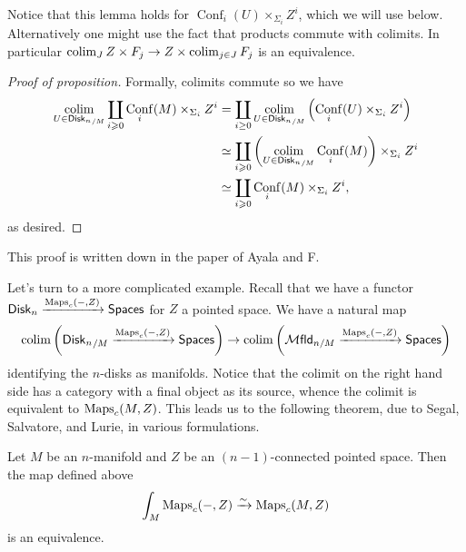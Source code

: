 \documentclass{amsart}
\DeclareMathOperator{\Conf}{Conf}
\newcommand{\disk}{\mathsf{Disk}_n}
\begin{document}
Notice that this lemma holds for $\Conf_i(U)\times_{\Sigma_i}Z^i$, which we will use
below. Alternatively one might use the fact that products commute with colimits.
In particular $\operatorname*{colim}_J Z\times F_j\to Z\times \operatorname*{colim}_{j\in J} F_j$ is an equivalence.

\begin{proof}[Proof of proposition]
    Formally, colimits commute so we have
    \begin{align*}
        \colim_{U\in{\disk}_{/M}} \coprod_{i\geqslant 0} \Conf_i(M)\times_{\Sigma_i}Z^i &= \coprod_{i\geq 0}\colim_{U\in{\disk}_{/M}}\left(\Conf_i(U)\times_{\Sigma_i}Z^i\right) \\
        &\simeq \coprod_{i\geqslant 0} \left(\colim_{U\in{\disk}_{/M}}\Conf_i(M)\right) \times_{\Sigma_i} Z^i \\
        &\simeq \coprod_{i\geqslant 0} \Conf_i(M) \times_{\Sigma_i}Z^i,
    \end{align*}
    as desired.
\end{proof}
This proof is written down in the paper \cite{AF} of Ayala and F.

Let's turn to a more complicated example. Recall that we have a functor ${\disk}\xrightarrow{\Maps_c(-,Z)}\mathsf{Spaces}$
for $Z$ a pointed space.
We have a natural map
\begin{equation*}
    \colim\left( {\disk}_{/M}\xrightarrow{\Maps_c(-,Z)}\mathsf{Spaces} \right) \to \colim \left( \mathcal{M}\mathsf{fld}_{n/M}\xrightarrow{\Maps_c(-,Z)}\mathsf{Spaces} \right)
\end{equation*}
identifying the $n$-disks as manifolds.
Notice that the colimit on the right hand side has a category with a final object as its source, whence the colimit
is equivalent to $\operatorname{Maps}_c(M,Z)$. This leads us to the following theorem, due to Segal, Salvatore, and Lurie,
in various formulations.
\begin{theorem}
    Let $M$ be an $n$-manifold and $Z$ be an $(n-1)$-connected pointed space. Then the map
    defined above
    \begin{equation*}
        \int_M \operatorname{Maps}_c(-, Z) \xrightarrow{\sim} \operatorname{Maps}_c(M,Z)
    \end{equation*}
    is an equivalence.
\end{theorem}
\end{document}
